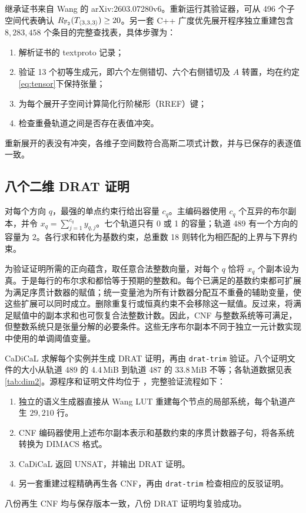 \documentclass[11pt,a4paper]{article}
\begin{document}
继承证书来自 Wang 的 arXiv:2603.07280v6\cite{wangautomated}。重新运行其验证器，可从 496 个子空间代表确认 $R_{\mathbb{F}_2}(T_{\langle3,3,3\rangle})\ge20$。另一套 C++ 广度优先展开程序独立重建包含 $8{,}283{,}458$ 个条目的完整查找表，具体步骤为：
\begin{enumerate}
  \item 解析证书的 textproto 记录；
  \item 验证 13 个初等生成元，即六个左侧错切、六个右侧错切及 $A$ 转置，均在约定\eqref{eq:tensor}下保持张量；
  \item 为每个展开子空间计算简化行阶梯形（RREF）键；
  \item 检查重叠轨道之间是否存在表值冲突。
\end{enumerate}
重新展开的表没有冲突，各维子空间数符合高斯二项式计数，并与已保存的表逐值一致。

\subsection{八个二维 DRAT 证明}

对每个方向 $q$，最强的单点约束行给出容量 $c_q$。主编码器使用 $c_q$ 个互异的布尔副本，并令 $x_q=\sum_{j=1}^{c_q}y_{q,j}$。七个轨道只有 0 或 1 的容量；轨道 489 有一个方向的容量为 2。各行求和转化为基数约束，总重数 18 则转化为相匹配的上界与下界约束。

为验证证明所需的正向蕴含，取任意合法整数向量，对每个 $q$ 恰将 $x_q$ 个副本设为真。于是每行的布尔求和都恰等于预期的整数和。每个已满足的基数约束都可扩展为满足序贯计数器的赋值；统一变量池为所有计数器分配互不重叠的辅助变量，使这些扩展可以同时成立。删除重复行或恒真约束不会移除这一赋值。反过来，将满足赋值中的副本求和也可恢复合法整数计数。因此，CNF 与整数系统等可满足，但整数系统只是张量分解的必要条件。这些无序布尔副本不同于独立一元计数实现中使用的单调阈值变量。

CaDiCaL 求解每个实例并生成 DRAT 证明，再由 \texttt{drat-trim} 验证。八个证明文件的大小从轨道 489 的 4.4\,MiB 到轨道 487 的 33.8\,MiB 不等；各轨道数据见表\ref{tab:dim2}。源程序和证明文件均位于 ，完整验证流程如下：
\begin{enumerate}
  \item 独立的语义生成器直接从 Wang LUT 重建每个节点的局部系统，每个轨道产生 $29{,}210$ 行。
  \item CNF 编码器使用上述布尔副本表示和基数约束的序贯计数器子句，将各系统转换为 DIMACS 格式。
  \item CaDiCaL 返回 UNSAT，并输出 DRAT 证明。
  \item 另一套重建过程精确再生各 CNF，再由 \texttt{drat-trim} 检查相应的反驳证明。
\end{enumerate}
八份再生 CNF 均与保存版本一致，八份 DRAT 证明均复验成功。
\end{document}
